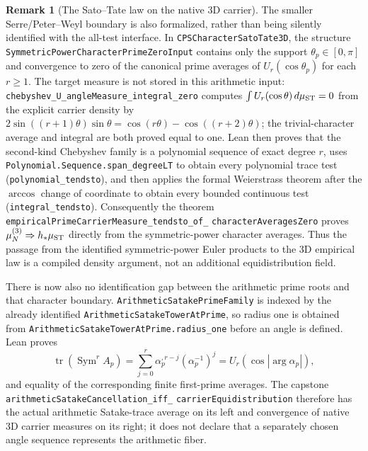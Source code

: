 \documentclass[11pt]{article}
\theoremstyle{definition}
\newtheorem{remark}[theorem]{Remark}
\newcommand{\Sym}{\operatorname{Sym}}
\begin{document}
\begin{remark}[The Sato--Tate law on the native 3D carrier]
The smaller Serre/Peter--Weyl boundary is also formalized, rather than being silently identified
with the all-test interface.  In \texttt{CPSCharacterSatoTate3D}, the structure
\texttt{SymmetricPowerCharacterPrime\-ZeroInput} contains only the support
$\theta_p\in[0,\pi]$ and convergence to zero of the canonical prime averages of
$U_r(\cos\theta_p)$ for each $r\geq1$.  The target measure is not stored in this arithmetic
input: \texttt{chebyshev\_U\_angleMeasure\_integral\_zero} computes
$\int U_r(\cos\theta)\,d\mu_{\rm ST}=0$ from the explicit carrier density by
$2\sin((r+1)\theta)\sin\theta=\cos(r\theta)-\cos((r+2)\theta)$; the trivial-character
average and integral are both proved equal to one.  Lean then proves that the second-kind Chebyshev family is a
polynomial sequence of exact degree $r$, uses
\texttt{Polynomial.Sequence.span\_degreeLT} to obtain every polynomial trace test
(\texttt{polynomial\_tendsto}), and then applies the formal Weierstrass theorem after the
$\arccos$ change of coordinate to obtain every bounded continuous test
(\texttt{integral\_tendsto}).  Consequently the theorem
\texttt{empiricalPrimeCarrierMeasure\_tendsto\_of\_}\allowbreak
\texttt{characterAveragesZero} proves
$\mu_N^{(3)}\Rightarrow h_*\mu_{\rm ST}$ directly from the symmetric-power character averages.
Thus the passage from the identified symmetric-power Euler products to the 3D empirical law is a
compiled density argument, not an additional equidistribution field.

There is now also no identification gap between the arithmetic prime roots and that character
boundary.  \texttt{ArithmeticSatakePrimeFamily} is indexed by the already identified
\texttt{ArithmeticSatakeTowerAtPrime}, so radius one is obtained from
\texttt{ArithmeticSatakeTowerAtPrime.radius\_one} before an angle is defined.  Lean proves
\[
 \operatorname{tr}(\Sym^r A_p)
 =\sum_{j=0}^{r}\alpha_p^{,r-j}(\alpha_p^{-1})^j
 =U_r(\cos|\arg\alpha_p|),
\]
and equality of the corresponding finite first-prime averages.  The capstone
\texttt{arithmeticSatakeCancellation\_iff\_}\allowbreak
\texttt{carrierEquidistribution} therefore has the actual
arithmetic Satake-trace average on its left and convergence of native 3D carrier measures on its
right; it does not declare that a separately chosen angle sequence represents the arithmetic
fiber.
\end{remark}
\end{document}
